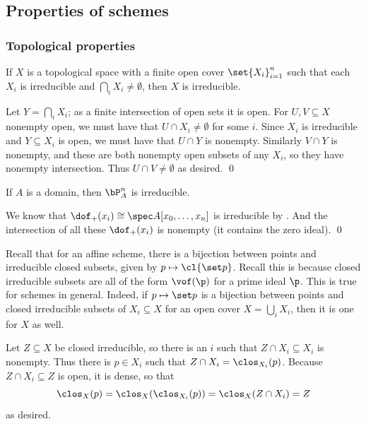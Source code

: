 \subsection{Properties of schemes}

\subsubsection{Topological properties}

\bprop

    If $X$ is a topological space with a finite open cover $\set{X_i}_{i=1}^n$ such that each $X_i$ is irreducible and $\bigcap_iX_i\neq\emptyset$,
    then $X$ is irreducible.

\eprop

\bproof

    Let $Y=\bigcap_iX_i$; as a finite intersection of open sets it is open.
    For $U,V\subseteq X$ nonempty open, we must have that $U\cap X_i\neq\emptyset$ for some $i$.
    Since $X_i$ is irreducible and $Y\subseteq X_i$ is open, we must have that $U\cap Y$ is nonempty.
    Similarly $V\cap Y$ is nonempty, and these are both nonempty open subsets of any $X_i$, so they have nonempty intersection.
    Thus $U\cap V\neq\emptyset$ as desired.
    \qed

\eproof

\bcoro

    If $A$ is a domain, then $\bP^n_A$ is irreducible.

\ecoro

\bproof

    We know that $\dof_+(x_i)\cong\spec A[x_0,\dots,x_n]$ is irreducible by .
    And the intersection of all these $\dof_+(x_i)$ is nonempty (it contains the zero ideal).
    \qed

\eproof

Recall that for an affine scheme, there is a bijection between points and irreducible closed subsets, given by $p\mapsto\cl{\set p}$.
Recall this is because closed irreducible subsets are all of the form $\vof(\p)$ for a prime ideal $\p$.
This is true for schemes in general.
Indeed, if $p\mapsto\set p$ is a bijection between points and closed irreducible subsets of $X_i\subseteq X$ for an open cover $X=\bigcup_iX_i$, then
it is one for $X$ as well.

Let $Z\subseteq X$ be closed irreducible, so there is an $i$ such that $Z\cap X_i\subseteq X_i$ is nonempty.
Thus there is $p\in X_i$ such that $Z\cap X_i=\clos_{X_i}(p)$.
Because $Z\cap X_i\subseteq Z$ is open, it is dense, so that
$$ \clos_X(p) = \clos_X(\clos_{X_i}(p)) = \clos_X(Z\cap X_i) = Z $$
as desired.

